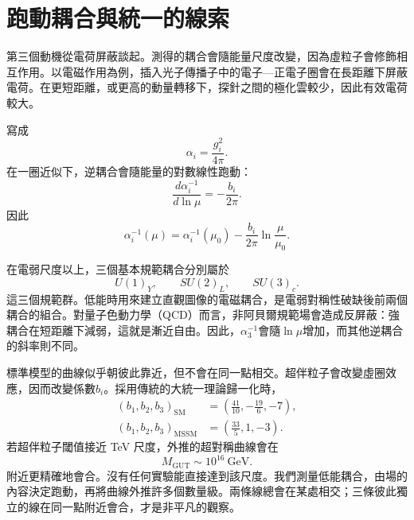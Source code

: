 \section{跑動耦合與統一的線索}

第三個動機從電荷屏蔽談起。測得的耦合會隨能量尺度改變，因為虛粒子會修飾相互作用。以電磁作用為例，插入光子傳播子中的電子—正電子圈會在長距離下屏蔽電荷。在更短距離，或更高的動量轉移下，探針之間的極化雲較少，因此有效電荷較大。

寫成
\begin{equation}
\alpha_i=\frac{g_i^2}{4\pi}.
\end{equation}
在一圈近似下，逆耦合會隨能量的對數線性跑動：
\begin{equation}
\frac{d\alpha_i^{-1}}{d\ln\mu}
=-\frac{b_i}{2\pi}.
\end{equation}
因此
\begin{equation}
\alpha_i^{-1}(\mu)
=\alpha_i^{-1}(\mu_0)
-\frac{b_i}{2\pi}\ln\frac{\mu}{\mu_0}.
\end{equation}

在電弱尺度以上，三個基本規範耦合分別屬於
\begin{equation}
U(1)_Y,\qquad SU(2)_L,\qquad SU(3)_c.
\end{equation}
這三個規範群。低能時用來建立直觀圖像的電磁耦合，是電弱對稱性破缺後前兩個耦合的組合。對量子色動力學（QCD）而言，非阿貝爾規範場會造成反屏蔽：強耦合在短距離下減弱，這就是漸近自由。因此，\(\alpha_3^{-1}\)會隨\(\ln\mu\)增加，而其他逆耦合的斜率則不同。

標準模型的曲線似乎朝彼此靠近，但不會在同一點相交。超伴粒子會改變虛圈效應，因而改變係數\(b_i\)。採用傳統的大統一理論歸一化時，
\begin{align}
(b_1,b_2,b_3)_{\mathrm{SM}}
&=\left(\frac{41}{10},-\frac{19}{6},-7\right),\\
(b_1,b_2,b_3)_{\mathrm{MSSM}}
&=\left(\frac{33}{5},1,-3\right).
\end{align}
若超伴粒子閾值接近 TeV 尺度，外推的超對稱曲線會在
\begin{equation}
M_{\mathrm{GUT}}\sim 10^{16}\ \mathrm{GeV}.
\end{equation}
附近更精確地會合。沒有任何實驗能直接達到該尺度。我們測量低能耦合，由場的內容決定跑動，再將曲線外推許多個數量級。兩條線總會在某處相交；三條彼此獨立的線在同一點附近會合，才是非平凡的觀察。

\begin{classroomqa}
\end{classroomqa}

